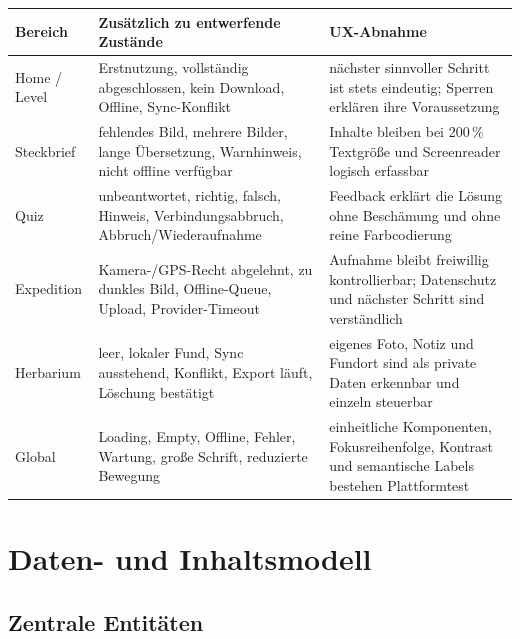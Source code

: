 \documentclass[10pt,a4paper,oneside]{article}
\begin{document}
\begin{landscape}
\begin{tabularx}{\linewidth}{@{}p{25mm}p{90mm}X@{}}
\toprule
\textbf{Bereich} & \textbf{Zusätzlich zu entwerfende Zustände} & \textbf{UX-Abnahme} \\
\midrule
Home / Level & Erstnutzung, vollständig abgeschlossen, kein Download, Offline, Sync-Konflikt & nächster sinnvoller Schritt ist stets eindeutig; Sperren erklären ihre Voraussetzung \\
Steckbrief & fehlendes Bild, mehrere Bilder, lange Übersetzung, Warnhinweis, nicht offline verfügbar & Inhalte bleiben bei 200\,\% Textgröße und Screenreader logisch erfassbar \\
Quiz & unbeantwortet, richtig, falsch, Hinweis, Verbindungsabbruch, Abbruch/Wiederaufnahme & Feedback erklärt die Lösung ohne Beschämung und ohne reine Farbcodierung \\
Expedition & Kamera-/GPS-Recht abgelehnt, zu dunkles Bild, Offline-Queue, Upload, Provider-Timeout & Aufnahme bleibt freiwillig kontrollierbar; Datenschutz und nächster Schritt sind verständlich \\
Herbarium & leer, lokaler Fund, Sync ausstehend, Konflikt, Export läuft, Löschung bestätigt & eigenes Foto, Notiz und Fundort sind als private Daten erkennbar und einzeln steuerbar \\
Global & Loading, Empty, Offline, Fehler, Wartung, große Schrift, reduzierte Bewegung & einheitliche Komponenten, Fokusreihenfolge, Kontrast und semantische Labels bestehen Plattformtest \\
\bottomrule
\end{tabularx}
\end{landscape}
\clearpage

\section{Daten- und Inhaltsmodell}

\subsection{Zentrale Entitäten}
\end{document}
